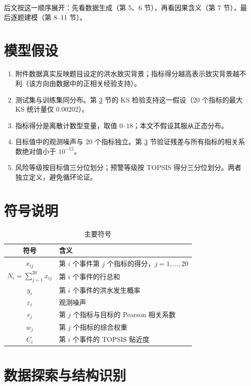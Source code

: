 \documentclass[12pt,a4paper]{ctexart}
\begin{document}
后文按这一顺序展开：先看数据生成（第 5、6 节），再看因果含义（第 7 节），最后逐题建模（第 8–11 节）。

\section{模型假设}

\begin{enumerate}
  \item 附件数据真实反映题目设定的洪水致灾背景；指标得分越高表示致灾背景越不利（该方向由数据中的正相关经验支持）。
  \item 测试集与训练集同分布。第 \ref{sec:eda} 节的 KS 检验支持这一假设（20 个指标的最大 KS 统计量仅 0.00202）。
  \item 指标得分是离散计数型变量，取值 $0$–$18$；本文不假设其服从正态分布。
  \item 目标值中的观测噪声与 20 个指标独立。第 \ref{sec:eda} 节验证残差与所有指标的相关系数绝对值小于 $10^{-15}$。
  \item 风险等级按目标值三分位划分；预警等级按 TOPSIS 得分三分位划分。两者独立定义，避免循环论证。
\end{enumerate}

\section{符号说明}

\begin{table}[H]
\centering
\caption{主要符号}
\begin{tabular}{cl}
\toprule
符号 & 含义 \\
\midrule
$x_{ij}$ & 第 $i$ 个事件第 $j$ 个指标的得分，$j=1,\dots,20$ \\
$N_i=\sum_{j=1}^{20}x_{ij}$ & 第 $i$ 个事件的行总和 \\
$y_i$ & 第 $i$ 个事件的洪水发生概率 \\
$\varepsilon_i$ & 观测噪声 \\
$r_j$ & 第 $j$ 个指标与目标的 Pearson 相关系数 \\
$w_j$ & 第 $j$ 个指标的综合权重 \\
$C_i$ & 第 $i$ 个事件的 TOPSIS 贴近度 \\
\bottomrule
\end{tabular}
\end{table}

\section{数据探索与结构识别}\label{sec:eda}
\end{document}

